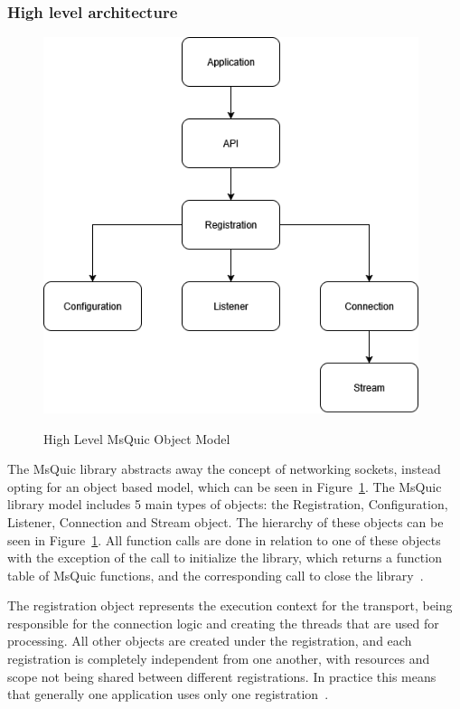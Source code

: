 \documentclass[english, 12pt, a4paper, elec, utf8, a-2b, online]{aaltothesis}
\begin{document}
\subsubsection{High level architecture}

\begin{figure}[h]
	\centering
	\includegraphics[alt={Block diagram of the high level object model of the MsQuic library, including relationships}, height=11cm]{./images/msquic_architecture.png}
	\caption{High Level MsQuic Object Model}
	\label{fig:msquic_arch}
\end{figure}

The MsQuic library abstracts away the concept of networking sockets, instead opting
for an object based model, which can be seen in Figure~\ref{fig:msquic_arch}. The
MsQuic library model includes 5 main types of objects: the Registration, Configuration,
Listener, Connection and Stream object. The hierarchy of these objects can be seen
in Figure~\ref{fig:msquic_arch}. All function calls are done in relation to one of
these objects with the exception of the call to initialize the library, which returns
a function table of MsQuic functions, and the corresponding call to close the library~\cite{msquic_docs}.

The registration object represents the execution context for the transport, being
responsible for the connection logic and creating the threads that are used for
processing. All other objects are created under the registration, and each registration
is completely independent from one another, with resources and scope not being
shared between different registrations. In practice this means that generally one
application uses only one registration~\cite{msquic_docs}.
\end{document}
